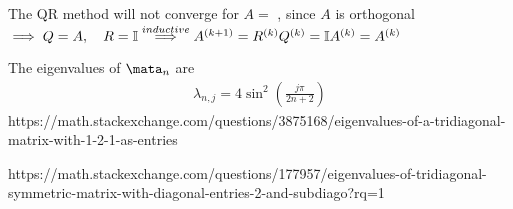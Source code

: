 \begin{SolutionSheet}[\ref{sheet4}]
\begin{onehalfspace}
  \begin{Solution}
    The QR method will not converge for $A=$ , since $A$ is orthogonal \\
    $\implies Q=A, \quad R=\mathbb{I} \\
    \stackrel{inductive}{\implies} A^{(k+1)} = R^{(k)}Q^{(k)} = \mathbb{I} A^{(k)} = A^{(k)}$
  \end{Solution}

  \begin{Solution}[Programming]
    The eigenvalues of $\mata_n$ are
    \begin{gather*}
      \lambda_{n,j} = 4\sin^2\left(\frac{j\pi}{2n+2}\right)
    \end{gather*}
  https://math.stackexchange.com/questions/3875168/eigenvalues-of-a-tridiagonal-matrix-with-1-2-1-as-entries

  https://math.stackexchange.com/questions/177957/eigenvalues-of-tridiagonal-symmetric-matrix-with-diagonal-entries-2-and-subdiago?rq=1
  \end{Solution}

\end{onehalfspace}
\end{SolutionSheet}


